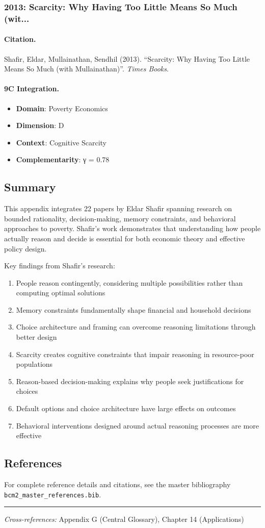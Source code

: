 \subsubsection{2013: Scarcity: Why Having Too Little Means So Much (wit...}

\paragraph{Citation.}
Shafir, Eldar, Mullainathan, Sendhil (2013). ``Scarcity: Why Having Too Little Means So Much (with Mullainathan)''. \textit{Times Books}.

\paragraph{9C Integration.}
\begin{itemize}[nosep]
  \item \textbf{Domain}: Poverty Economics
  \item \textbf{Dimension}: D
  \item \textbf{Context}: Cognitive Scarcity
  \item \textbf{Complementarity}: γ = 0.78
\end{itemize}


\subsection{Summary}

This appendix integrates 22 papers by Eldar Shafir spanning research on bounded rationality, decision-making, memory constraints, and behavioral approaches to poverty. Shafir's work demonstrates that understanding how people actually reason and decide is essential for both economic theory and effective policy design.

Key findings from Shafir's research:

\begin{enumerate}
  \item People reason contingently, considering multiple possibilities rather than computing optimal solutions
  \item Memory constraints fundamentally shape financial and household decisions
  \item Choice architecture and framing can overcome reasoning limitations through better design
  \item Scarcity creates cognitive constraints that impair reasoning in resource-poor populations
  \item Reason-based decision-making explains why people seek justifications for choices
  \item Default options and choice architecture have large effects on outcomes
  \item Behavioral interventions designed around actual reasoning processes are more effective
\end{enumerate}

\subsection{References}

For complete reference details and citations, see the master bibliography
\texttt{bcm2\_master\_references.bib}.

\vspace{1em}
\hrule
\vspace{0.5em}

\noindent\textit{Cross-references:}
Appendix G (Central Glossary), Chapter 14 (Applications)
